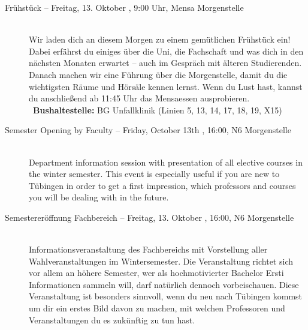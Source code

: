 \begin{description}
\ifbachelor \pagebreak  \fi

\ifbachelor
 	\item[Frühstück -- Freitag, 13. Oktober \YEAR, 9:00 Uhr, Mensa Morgenstelle]\ \\
 	Wir laden dich an diesem Morgen zu einem gemütlichen Frühstück ein! Dabei erfährst du einiges über die Uni, die Fachschaft und was dich in den nächsten Monaten erwartet -- auch im Gespräch mit älteren Studierenden.
 	Danach machen wir eine Führung über die Morgenstelle, damit du die wichtigsten Räume und Hörsäle kennen lernst.
 	Wenn du Lust hast, kannst du anschließend ab 11:45 Uhr das Mensaessen ausprobieren.\\
 	~\textbf{Bushaltestelle:} BG Unfallklinik (Linien 5, 13, 14, 17, 18, 19, X15)
\fi

\ifml
	\item[Semester Opening by Faculty -- Friday, October 13th \YEAR, 16:00, N6 Morgenstelle]\ \\
	Department information session with presentation of all elective courses in the winter semester.
	This event is especially useful if you are new to Tübingen in order to get a first impression,
	which professors and courses you will be dealing with in the future.
\else
	\item[Semestereröffnung Fachbereich -- Freitag, 13. Oktober \YEAR, 16:00, N6 Morgenstelle]\ \\
	Informationsveranstaltung des Fachbereichs mit Vorstellung aller
	Wahlveranstaltungen im Wintersemester. 
	\ifbachelor
	Die Veranstaltung richtet sich vor allem an höhere Semester, 
	wer als hochmotivierter Bachelor Ersti Informationen sammeln will, darf natürlich dennoch vorbeischauen.
	\else
	Diese Veranstaltung ist besonders sinnvoll, wenn du neu nach Tübingen kommst um dir ein erstes Bild davon zu machen,
	mit welchen Professoren und Veranstaltungen du es zukünftig zu tun hast.
	\fi
\fi


\end{description}
